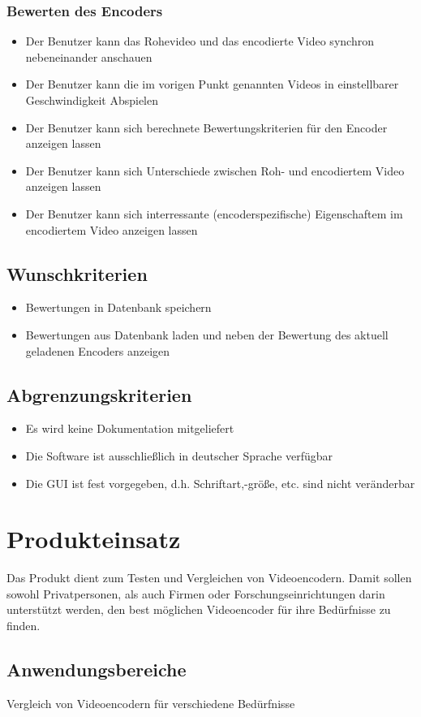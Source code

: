 \documentclass[parskip=full]{scrartcl}
\begin{document}
\subsubsection{Bewerten des Encoders}
\begin{itemize}
\item Der Benutzer kann das Rohevideo und das encodierte Video synchron nebeneinander anschauen
\item Der Benutzer kann die im vorigen Punkt genannten Videos in einstellbarer Geschwindigkeit
Abspielen
\item Der Benutzer kann sich berechnete Bewertungskriterien für den Encoder anzeigen lassen
\item Der Benutzer kann sich Unterschiede zwischen Roh- und encodiertem Video anzeigen lassen
\item Der Benutzer kann sich interressante (encoderspezifische) Eigenschaftem im encodiertem
Video anzeigen lassen
\end{itemize}
\subsection{Wunschkriterien}
\begin{itemize}
\item Bewertungen in Datenbank speichern
\item Bewertungen aus Datenbank laden und neben der Bewertung des aktuell geladenen Encoders anzeigen
\end{itemize}
\subsection{Abgrenzungskriterien}
\begin{itemize}
\item Es wird keine Dokumentation mitgeliefert
\item Die Software ist ausschließlich in deutscher Sprache verfügbar
\item Die GUI ist fest vorgegeben, d.h. Schriftart,-größe, etc. sind nicht veränderbar
\end{itemize}
\newpage
\section{Produkteinsatz}
Das Produkt dient zum Testen und Vergleichen von Videoencodern. 
Damit sollen sowohl Privatpersonen, als auch Firmen oder Forschungseinrichtungen darin unterstützt werden, den best möglichen Videoencoder für ihre Bedürfnisse zu finden.
\subsection{Anwendungsbereiche}
Vergleich von Videoencodern für verschiedene Bedürfnisse
\end{document}

